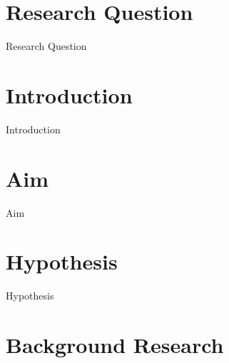 \documentclass[12pt, a4paper]{article}
\begin{document}
\maketitle

\tableofcontents
\clearpage






			
			

\section{{Research Question}}
		
	{Research Question}
		
\section{{Introduction}}
        
        {Introduction}       
        
\section{{Aim}}
        
        {Aim}

			
			
			
				
\section{{Hypothesis}}
        
        {Hypothesis}    
        
\section{{Background Research}}
        
\end{document}
